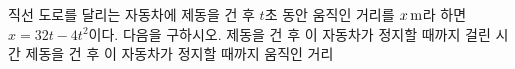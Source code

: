 직선 도로를 달리는 자동차에 제동을 건 후 $t$초 동안 움직인 거리를 $x\mkern3mu \mathrm{m}$라 하면 $x=32t-4t^2$이다. 다음을 구하시오.
 제동을 건 후 이 자동차가 정지할 때까지 걸린 시간
 제동을 건 후 이 자동차가 정지할 때까지 움직인 거리
